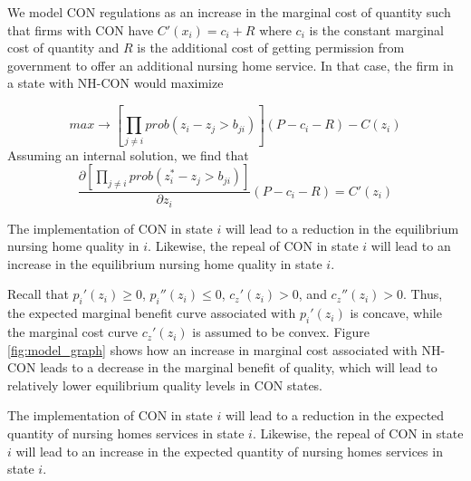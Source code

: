 \documentclass[../Main.tex]{subfiles}
\begin{document}
We model CON regulations as an increase in the marginal cost of quantity such that firms with CON have $C'(x_i) = c_i + R$ where $c_i$ is the constant marginal cost of quantity  and $R$ is the additional cost of getting permission from government to offer an additional nursing home service. In that case, the firm in a state with NH-CON would maximize

\begin{equation} max \rightarrow [\prod_{j\neq i} prob(z_i -z_j > b_{ji})](P - c_i - R) - C(z_i) \end{equation}
Assuming an internal solution, we find that
 \begin{equation}\frac{\partial [\prod_{j\neq i} prob(z_i^* - z_j > b_{ji})]}{\partial z_i}(P - c_i - R) = C'(z_i) \end{equation}




\begin{Proposition}\label{prop1}
The implementation of CON in state $i$ will lead to a reduction in the equilibrium nursing home quality in $i$. Likewise, the repeal of CON in state $i$ will lead to an increase in the equilibrium nursing home quality in state $i$. 
\end{Proposition}


Recall that $p_{i}'(z_i)\geq 0$, $p_{i}''(z_i) \leq 0$, $c_z'(z_i)>0$, and $c_z''(z_i)>0$. Thus, the expected marginal benefit curve associated with $p_{i}'(z_i)$ is concave, while the marginal cost curve $c_z'(z_i)$ is assumed to be convex. Figure \ref{fig:model_graph} shows how an increase in marginal cost associated with NH-CON leads to a decrease in the marginal benefit of quality, which will lead to relatively lower equilibrium quality levels in CON states.


\begin{Proposition}\label{prop2}
The implementation of CON in state $i$ will lead to a reduction in the expected quantity of nursing homes services in state $i$. Likewise, the repeal of CON in state $i$ will lead to an increase in the expected quantity of nursing homes services in state $i$. 
\end{Proposition}
\end{document}
